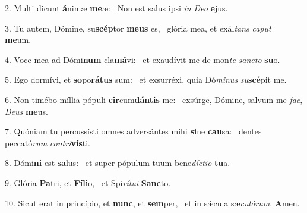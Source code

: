 2. Multi dicunt \textbf{á}nimæ \textbf{me}æ: \ast\  Non est salus ipsi \textit{in} \textit{De}\textit{o} \textbf{e}jus.\

3. Tu autem, Dómine, su\textbf{scép}tor \textbf{me}\textbf{us} es, \ast\  glória mea, et exál\textit{tans} \textit{ca}\textit{put} \textbf{me}um.\

4. Voce mea ad Dómi\textbf{num} cla\textbf{má}vi: \ast\  et exaudívit me de mon\textit{te} \textit{sanc}\textit{to} \textbf{su}o.\

5. Ego dormívi, et \textbf{so}po\textbf{rá}\textbf{tus} sum: \ast\  et exsurréxi, quia Dó\textit{mi}\textit{nus} \textit{su}\textbf{scé}pit me.\

6. Non timébo míllia pópuli \textbf{cir}cum\textbf{dán}\textbf{tis} me: \ast\  exsúrge, Dómine, salvum me \textit{fac}, \textit{De}\textit{us} \textbf{me}us.\

7. Quóniam tu percussísti omnes adversántes mihi \textbf{si}ne \textbf{cau}sa: \ast\  dentes peccató\textit{rum} \textit{con}\textit{tri}\textbf{vís}ti.\

8. Dómi\textbf{ni} est \textbf{sa}lus: \ast\  et super pópulum tuum bene\textit{díc}\textit{ti}\textit{o} \textbf{tu}a.\

9. Glória \textbf{Pa}tri, et \textbf{Fí}\textbf{li}o, \ast\  et Spi\textit{rí}\textit{tu}\textit{i} \textbf{Sanc}to.\

10. Sicut erat in princípio, et \textbf{nunc}, et \textbf{sem}per, \ast\  et in sǽcula sæ\textit{cu}\textit{ló}\textit{rum}. \textbf{A}men.\

